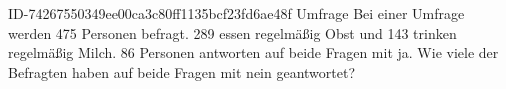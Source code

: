 \begin{exercise}
      {ID-74267550349ee00ca3c80ff1135bcf23fd6ae48f}
      {Umfrage}
  \ifproblem\problem
    Bei einer Umfrage werden 475 Personen befragt. 289 essen regelmäßig Obst und
    143 trinken regelmäßig Milch. 86 Personen antworten auf beide Fragen mit ja.
    Wie viele der Befragten haben auf beide Fragen mit nein geantwortet?
  \fi
\end{exercise}
